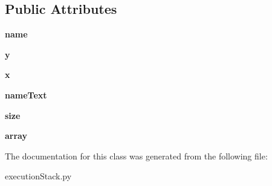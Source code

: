 \subsection*{Public Attributes}
\begin{DoxyCompactItemize}
\item 
{\bfseries name}\hypertarget{classexecution_stack_1_1_visual_array_a023a4ef16ccae091bef57d53e2a51dae}{}\label{classexecution_stack_1_1_visual_array_a023a4ef16ccae091bef57d53e2a51dae}

\item 
{\bfseries y}\hypertarget{classexecution_stack_1_1_visual_array_ab3f2e9efc42105c4331895a70a8b4eee}{}\label{classexecution_stack_1_1_visual_array_ab3f2e9efc42105c4331895a70a8b4eee}

\item 
{\bfseries x}\hypertarget{classexecution_stack_1_1_visual_array_a39c643fa75477c85f01f9e1b0108f353}{}\label{classexecution_stack_1_1_visual_array_a39c643fa75477c85f01f9e1b0108f353}

\item 
{\bfseries name\+Text}\hypertarget{classexecution_stack_1_1_visual_array_a8d513f04c041be10b60a472341aca538}{}\label{classexecution_stack_1_1_visual_array_a8d513f04c041be10b60a472341aca538}

\item 
{\bfseries size}\hypertarget{classexecution_stack_1_1_visual_array_a5498a6092e7d281cd651139137aa4bc7}{}\label{classexecution_stack_1_1_visual_array_a5498a6092e7d281cd651139137aa4bc7}

\item 
{\bfseries array}\hypertarget{classexecution_stack_1_1_visual_array_af9ff7cb5547d5a4f85a49350ff4fdef7}{}\label{classexecution_stack_1_1_visual_array_af9ff7cb5547d5a4f85a49350ff4fdef7}

\end{DoxyCompactItemize}


The documentation for this class was generated from the following file\+:\begin{DoxyCompactItemize}
\item 
execution\+Stack.\+py\end{DoxyCompactItemize}
